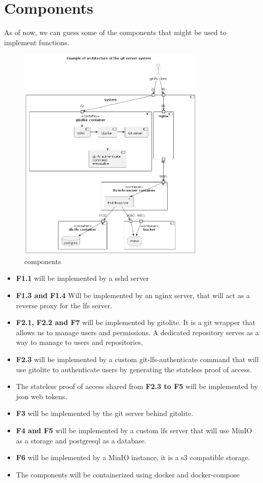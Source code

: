 \newpage
\section{Components}

As of now, we can guess some of the components that might be used to implement functions.

\begin{figure}[h]
    \centering
    \includegraphics[width=0.8\textwidth]{iteration_01/diagrams/components.png}
    \caption{components}
    \label{fig:components}
\end{figure}

\begin{itemize}
    \item \textbf{F1.1} will be implemented by a sshd server
    \item \textbf{F1.3 and F1.4} Will be implemented by an nginx server, that will act as a reverse proxy for the lfs server.
    \item \textbf{F2.1, F2.2 and F7} will be implemented by  gitolite. It is a git wrapper that allows us to manage users and permissions. A dedicated repository serves as a way to manage to users and repositories.
    \item \textbf{F2.3} will be implemented by a custom git-lfs-authenticate command that will use gitolite to authenticate users by generating the stateless proof of access.
    \item The stateless proof of access shared from \textbf{F2.3 to F5} will be implemented by json web tokens.
    \item \textbf{F3} will be implemented by the git server behind gitolite.
    \item \textbf{F4 and F5} will be implemented by  a custom lfs server that will use MinIO as a storage and postgresql as a database.
    \item \textbf{F6} will be implemented by a MinIO instance, it is a s3 compatible storage.
    \item The components will be containerized using docker and docker-compose
\end{itemize}

